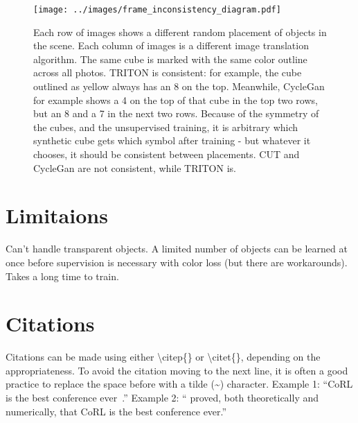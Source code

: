 \documentclass{article}
\begin{document}
\begin{figure}[H]
	\begin{center}
		\texttt{[image: ../images/frame\_inconsistency\_diagram.pdf]}
	\end{center}

	
	\caption{
		Each row of images shows a different random placement of objects in the scene.
		Each column of images is a different image translation algorithm.
		The same cube is marked with the same color outline across all photos.
		TRITON is consistent: for example, the cube outlined as yellow always has an 8 on the top.
		Meanwhile, CycleGan for example shows a 4 on the top of that cube in the top two rows, but an 8 and a 7 in the next two rows.
		Because of the symmetry of the cubes, and the unsupervised training, it is arbitrary which synthetic cube gets which symbol after training - but whatever it chooses, it should be consistent between placements.
		CUT and CycleGan are not consistent, while TRITON is.
		}
	\label{fig:frame_inconsistency_diagram}
\end{figure}


\section{Limitaions}
\label{sec:Limitations} 

Can't handle transparent objects. 
A limited number of objects can be learned at once before supervision is necessary with color loss (but there are workarounds).
Takes a long time to train.



\section{Citations} 
\label{sec:citations} 

Citations can be made using either \textbackslash citep\{\} or \textbackslash citet\{\}, depending on the appropriateness. To avoid the citation moving to the next line, it is often a good practice to replace the space before with a tilde (\~{}) character.
Example 1: ``CoRL is the best conference ever~\citep{fourier_feature_networks}.''
Example 2: ``\citet{fourier_feature_networks} proved, both theoretically and numerically, that CoRL is the best conference ever.''
\end{document}
